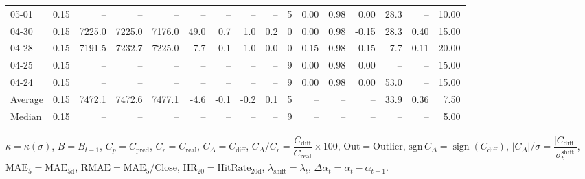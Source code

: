 \begin{threeparttable}
{\begin{tabular}{lrrrrrrrrrrrrrrr}
  05-01 &     0.15 &     -- &     -- &     -- &         -- &             -- &                       -- &                  -- &              5 &       0.00 &      0.98 &           0.00 &             28.3 &              -- &                  10.00 \\
  04-30 &     0.15 & 7225.0 & 7225.0 & 7176.0 &       49.0 &            0.7 &                      1.0 &                 0.2 &              0 &       0.00 &      0.98 &          -0.15 &             28.3 &            0.40 &                  15.00 \\
  04-28 &     0.15 & 7191.5 & 7232.7 & 7225.0 &        7.7 &            0.1 &                      1.0 &                 0.0 &              0 &       0.15 &      0.98 &           0.15 &              7.7 &            0.11 &                  20.00 \\
  04-25 &     0.15 &     -- &     -- &     -- &         -- &             -- &                       -- &                  -- &              9 &       0.00 &      0.98 &           0.00 &               -- &              -- &                  15.00 \\
  04-24 &     0.15 &     -- &     -- &     -- &         -- &             -- &                       -- &                  -- &              9 &       0.00 &      0.98 &           0.00 &             53.0 &              -- &                  15.00 \\
Average &     0.15 & 7472.1 & 7472.6 & 7477.1 &       -4.6 &           -0.1 &                     -0.2 &                 0.1 &              5 &         -- &        -- &             -- &             33.9 &            0.36 &                   7.50 \\
 Median &     0.15 &     -- &     -- &     -- &         -- &             -- &                       -- &                  -- &              9 &         -- &        -- &             -- &               -- &              -- &                   5.00 \\
\bottomrule
\end{tabular}
}
\begin{tablenotes}\footnotesize
\item $\kappa=\kappa(\sigma)$, $B=B_{t-1}$, $C_p=C_{\text{pred}}$, $C_r=C_{\text{real}}$, $C_\Delta=C_{\text{diff}}$, $C_\Delta/C_r=\dfrac{C_{\text{diff}}}{C_{\text{real}}}\times100$, $\mathrm{Out}=\text{Outlier}$, $\mathrm{sgn}\,C_\Delta=\operatorname{sign}(C_{\text{diff}})$, $|C_\Delta|/\sigma=\dfrac{|C_{\text{diff}}|}{\sigma_t^{\text{shift}}}$, $\mathrm{MAE}_5=\mathrm{MAE}_{5\text{d}}$, $\mathrm{RMAE}= \mathrm{MAE}_5 / \text{Close}$, $\mathrm{HR}_{20}=\mathrm{HitRate}_{20\text{d}}$, 
$\lambda_{\text{shift}}=\lambda_t$, 
$\Delta\alpha_t=\alpha_t-\alpha_{t-1}$.
\end{tablenotes}
\end{threeparttable}
\endgroup

